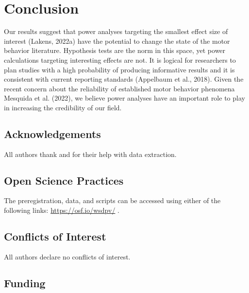 \documentclass[
  man, donotrepeattitle,mask,floatsintext]{apa7}
\begin{document}
\hypertarget{conclusion}{%
\section{Conclusion}\label{conclusion}}

Our results suggest that power analyses targeting the smallest effect size of interest (Lakens, 2022a) have the potential to change the state of the motor behavior literature. Hypothesis tests are the norm in this space, yet power calculations targeting interesting effects are not. It is logical for researchers to plan studies with a high probability of producing informative results and it is consistent with current reporting standards (Appelbaum et al., 2018). Given the recent concern about the reliability of established motor behavior phenomena Mesquida et al. (2022), we believe power analyses have an important role to play in increasing the credibility of our field.

\vspace{5ex}

\hypertarget{acknowledgements}{%
\subsection{Acknowledgements}\label{acknowledgements}}

\noindent All authors thank  and  for their help with data extraction.

\hypertarget{open-science-practices}{%
\subsection{Open Science Practices}\label{open-science-practices}}

\noindent The preregistration, data, and scripts can be accessed using either of the following links: \url{https://osf.io/wsdpv/}  .

\hypertarget{conflicts-of-interest}{%
\subsection{Conflicts of Interest}\label{conflicts-of-interest}}

\noindent All authors declare no conflicts of interest.

\hypertarget{funding}{%
\subsection{Funding}\label{funding}}
\end{document}
